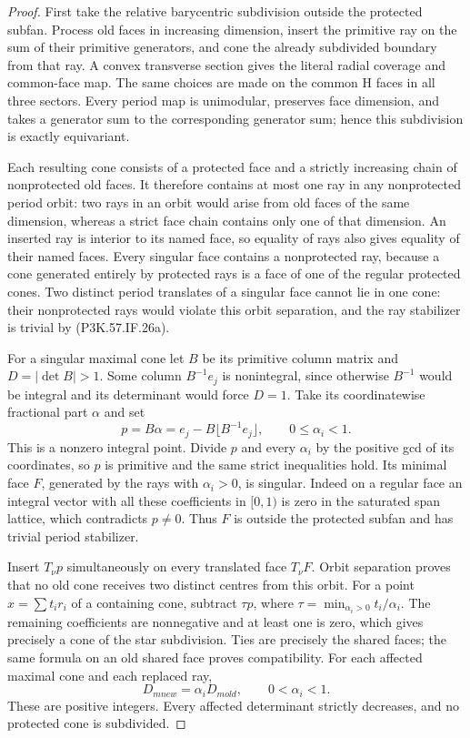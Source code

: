 \begin{proof}
First take the relative barycentric subdivision outside
the protected subfan. Process old faces in increasing
dimension, insert the primitive ray on the sum of their
primitive generators, and cone the already subdivided
boundary from that ray. A convex transverse section gives
the literal radial coverage and common-face map. The
same choices are made on the common H faces in all three
sectors. Every period map is unimodular, preserves face
dimension, and takes a generator sum to the corresponding
generator sum; hence this subdivision is exactly equivariant.

Each resulting cone consists of a protected face and a
strictly increasing chain of nonprotected old faces. It
therefore contains at most one ray in any nonprotected
period orbit: two rays in an orbit would arise from old
faces of the same dimension, whereas a strict face chain
contains only one of that dimension. An inserted ray is
interior to its named face, so equality of rays also gives
equality of their named faces. Every singular face contains
a nonprotected ray, because a cone generated entirely by
protected rays is a face of one of the regular protected
cones. Two distinct period translates of a singular face
cannot lie in one cone: their nonprotected rays would
violate this orbit separation, and the ray stabilizer is
trivial by (P3K.57.IF.26a).

For a singular maximal cone let \(B\) be its primitive
column matrix and \(D=|\det B|>1\). Some column
\(B^{-1}e_j\) is nonintegral, since otherwise \(B^{-1}\)
would be integral and its determinant would force \(D=1\).
Take its coordinatewise fractional part \(\alpha\) and set
\[
 p=B\alpha=e_j-B\lfloor B^{-1}e_j\rfloor,
 \qquad 0\le\alpha_i<1.                              \tag{P3K.57.IF.26b}
\]
This is a nonzero integral point. Divide \(p\) and every
\(\alpha_i\) by the positive gcd of its coordinates, so
\(p\) is primitive and the same strict inequalities hold.
Its minimal face \(F\), generated by the rays with
\(\alpha_i>0\), is singular. Indeed on a regular face
an integral vector with all these coefficients in
\([0,1)\) is zero in the saturated span lattice, which
contradicts \(p\ne0\). Thus \(F\) is outside the
protected subfan and has trivial period stabilizer.

Insert \(T_\nu p\) simultaneously on every translated
face \(T_\nu F\). Orbit separation proves that no old
cone receives two distinct centres from this orbit.
For a point \(x=\sum t_i r_i\) of a containing cone,
subtract \(\tau p\), where
\(\tau=\min_{\alpha_i>0}t_i/\alpha_i\). The remaining
coefficients are nonnegative and at least one is zero,
which gives precisely a cone of the star subdivision.
Ties are precisely the shared faces; the same formula
on an old shared face proves compatibility. For each
affected maximal cone and each replaced ray,
\[
                        D_{
m new}=\alpha_i D_{
m old},
                 \qquad 0<\alpha_i<1.                  \tag{P3K.57.IF.26c}
\]
These are positive integers. Every affected determinant
strictly decreases, and no protected cone is subdivided.


\end{proof}
